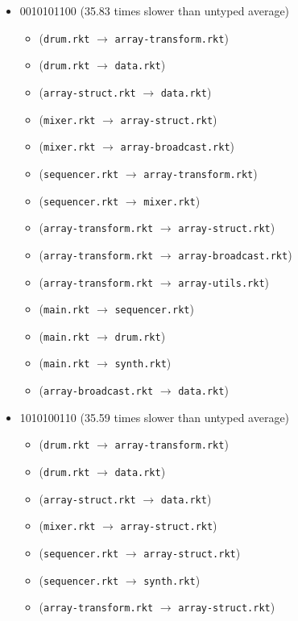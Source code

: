 \documentclass{article}
\newcommand{\mono}[1]{\texttt{#1}}
\begin{document}
\begin{itemize}
\begin{itemize}
  \end{itemize}
\item 0010101100 (35.83 times slower than untyped average)
  \begin{itemize}
  \item (\mono{drum.rkt} $\rightarrow$ \mono{array-transform.rkt})
  \item (\mono{drum.rkt} $\rightarrow$ \mono{data.rkt})
  \item (\mono{array-struct.rkt} $\rightarrow$ \mono{data.rkt})
  \item (\mono{mixer.rkt} $\rightarrow$ \mono{array-struct.rkt})
  \item (\mono{mixer.rkt} $\rightarrow$ \mono{array-broadcast.rkt})
  \item (\mono{sequencer.rkt} $\rightarrow$ \mono{array-transform.rkt})
  \item (\mono{sequencer.rkt} $\rightarrow$ \mono{mixer.rkt})
  \item (\mono{array-transform.rkt} $\rightarrow$ \mono{array-struct.rkt})
  \item (\mono{array-transform.rkt} $\rightarrow$ \mono{array-broadcast.rkt})
  \item (\mono{array-transform.rkt} $\rightarrow$ \mono{array-utils.rkt})
  \item (\mono{main.rkt} $\rightarrow$ \mono{sequencer.rkt})
  \item (\mono{main.rkt} $\rightarrow$ \mono{drum.rkt})
  \item (\mono{main.rkt} $\rightarrow$ \mono{synth.rkt})
  \item (\mono{array-broadcast.rkt} $\rightarrow$ \mono{data.rkt})
  \end{itemize}
\item 1010100110 (35.59 times slower than untyped average)
  \begin{itemize}
  \item (\mono{drum.rkt} $\rightarrow$ \mono{array-transform.rkt})
  \item (\mono{drum.rkt} $\rightarrow$ \mono{data.rkt})
  \item (\mono{array-struct.rkt} $\rightarrow$ \mono{data.rkt})
  \item (\mono{mixer.rkt} $\rightarrow$ \mono{array-struct.rkt})
  \item (\mono{sequencer.rkt} $\rightarrow$ \mono{array-struct.rkt})
  \item (\mono{sequencer.rkt} $\rightarrow$ \mono{synth.rkt})
  \item (\mono{array-transform.rkt} $\rightarrow$ \mono{array-struct.rkt})

\end{itemize}
\end{itemize}
\end{document}
